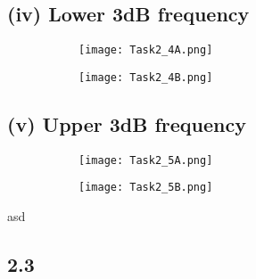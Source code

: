 	\subsection*{(iv) Lower 3dB frequency}

	\begin{figure}[h!]
	    \centering
	    \begin{subfigure}[h]{0.5\textwidth}
	            \texttt{[image: Task2\_4A.png]}
	            \label{fig:}
	    \end{subfigure}
	    \begin{subfigure}[h]{0.2\textwidth}
	            \texttt{[image: Task2\_4B.png]}
	            \label{fig:}
	    \end{subfigure}
	\end{figure}
	
	\subsection*{(v) Upper 3dB frequency}

	\begin{figure}[h!]
	    \centering
	    \begin{subfigure}[h]{0.5\textwidth}
	            \texttt{[image: Task2\_5A.png]}
	            \label{fig:}
	    \end{subfigure}
	    \begin{subfigure}[h]{0.2\textwidth}
	            \texttt{[image: Task2\_5B.png]}
	            \label{fig:}
	    \end{subfigure}
	\end{figure}
	asd




\subsection*{2.3}
  